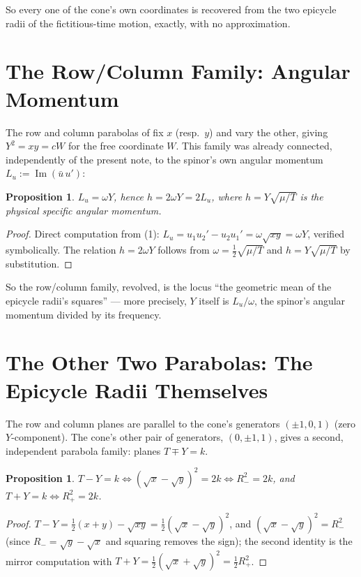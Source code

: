 \documentclass[12pt]{amsart}
\theoremstyle{plain}
\newtheorem{proposition}[theorem]{Proposition}
\theoremstyle{remark}
\begin{document}
So every one of the cone's own coordinates is recovered from the two epicycle radii of the fictitious-time motion, exactly, with no approximation.

\section{The Row/Column Family: Angular Momentum}

The row and column parabolas of \cite{Ebert2026Table} fix $x$ (resp.\ $y$) and vary the other, giving $Y^2=xy=cW$ for the free coordinate $W$. This family was already connected, independently of the present note, to the spinor's own angular momentum $L_u:=\operatorname{Im}(\bar u\,u')$:

\begin{proposition}
$L_u=\omega Y$, hence $h=2\omega Y=2L_u$, where $h=Y\sqrt{\mu/T}$ is the physical specific angular momentum.
\end{proposition}

\begin{proof}
Direct computation from (1): $L_u=u_1u_2'-u_2u_1'=\omega\sqrt{xy}=\omega Y$, verified symbolically. The relation $h=2\omega Y$ follows from $\omega=\tfrac12\sqrt{\mu/T}$ and $h=Y\sqrt{\mu/T}$ by substitution.
\end{proof}

So the row/column family, revolved, is the locus ``the geometric mean of the epicycle radii's squares'' --- more precisely, $Y$ itself is $L_u/\omega$, the spinor's angular momentum divided by its frequency.

\section{The Other Two Parabolas: The Epicycle Radii Themselves}

The row and column planes are parallel to the cone's generators $(\pm1,0,1)$ (zero $Y$-component). The cone's other pair of generators, $(0,\pm1,1)$, gives a second, independent parabola family: planes $T\mp Y=k$.

\begin{proposition}\label{prop:otherparabolas}
$T-Y=k \iff (\sqrt x-\sqrt y)^2=2k \iff R_-^2=2k$, and $T+Y=k\iff R_+^2=2k$.
\end{proposition}

\begin{proof}
$T-Y=\tfrac12(x+y)-\sqrt{xy}=\tfrac12(\sqrt x-\sqrt y)^2$, and $(\sqrt x-\sqrt y)^2=R_-^2$ (since $R_-=\sqrt y-\sqrt x$ and squaring removes the sign); the second identity is the mirror computation with $T+Y=\tfrac12(\sqrt x+\sqrt y)^2=\tfrac12 R_+^2$.
\end{proof}
\end{document}
